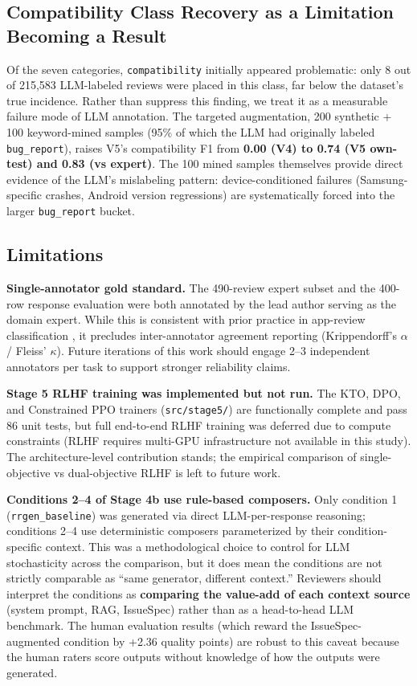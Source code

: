 \documentclass[sigconf, nonacm, anonymous, balance=false]{acmart}
\begin{document}
\subsection{Compatibility Class Recovery as a Limitation Becoming a Result}\label{compatibility-class-recovery-as-a-limitation-becoming-a-result}

Of the seven categories, \texttt{compatibility} initially appeared problematic: only 8 out of 215,583 LLM-labeled reviews were placed in this class, far below the dataset's true incidence. Rather than suppress this finding, we treat it as a measurable failure mode of LLM annotation. The targeted augmentation, 200 synthetic + 100 keyword-mined samples (95\% of which the LLM had originally labeled \texttt{bug\_report}), raises V5's compatibility F1 from \textbf{0.00 (V4) to 0.74 (V5 own-test) and 0.83 (vs expert)}. The 100 mined samples themselves provide direct evidence of the LLM's mislabeling pattern: device-conditioned failures (Samsung-specific crashes, Android version regressions) are systematically forced into the larger \texttt{bug\_report} bucket.

\subsection{Limitations}\label{limitations}

\textbf{Single-annotator gold standard.} The 490-review expert subset and the 400-row response evaluation were both annotated by the lead author serving as the domain expert. While this is consistent with prior practice in app-review classification \cite{maalej2016, chen2014arminer, villarroel2016}, it precludes inter-annotator agreement reporting (Krippendorff's $\alpha$ / Fleiss' $\kappa$). Future iterations of this work should engage 2--3 independent annotators per task to support stronger reliability claims.

\textbf{Stage 5 RLHF training was implemented but not run.} The KTO, DPO, and Constrained PPO trainers (\texttt{src/stage5/}) are functionally complete and pass 86 unit tests, but full end-to-end RLHF training was deferred due to compute constraints (RLHF requires multi-GPU infrastructure not available in this study). The architecture-level contribution stands; the empirical comparison of single-objective vs dual-objective RLHF is left to future work.

\textbf{Conditions 2--4 of Stage 4b use rule-based composers.} Only condition 1 (\texttt{rrgen\_baseline}) was generated via direct LLM-per-response reasoning; conditions 2--4 use deterministic composers parameterized by their condition-specific context. This was a methodological choice to control for LLM stochasticity across the comparison, but it does mean the conditions are not strictly comparable as ``same generator, different context.'' Reviewers should interpret the conditions as \textbf{comparing the value-add of each context source} (system prompt, RAG, IssueSpec) rather than as a head-to-head LLM benchmark. The human evaluation results (which reward the IssueSpec-augmented condition by +2.36 quality points) are robust to this caveat because the human raters score outputs without knowledge of how the outputs were generated.
\end{document}
